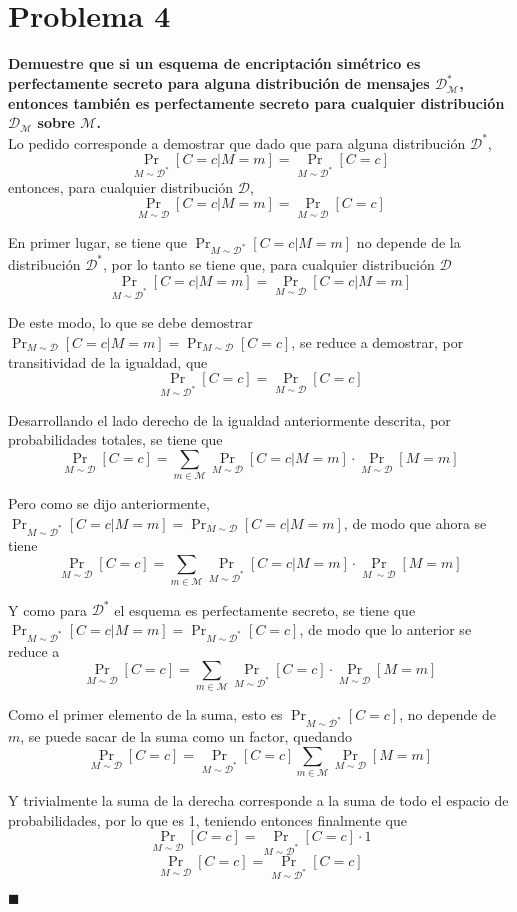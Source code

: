\documentclass[twoside]{tareas}
\begin{document}
\section*{Problema 4}

\textbf{Demuestre que si un esquema de encriptación simétrico es perfectamente secreto para alguna distribución de mensajes $\mathcal{D}_{\mathcal{M}}^{*}$, entonces también es perfectamente secreto para cualquier distribución $\mathcal{D}_{\mathcal{M}}$ sobre $\mathcal{M}$.}\\

Lo pedido corresponde a demostrar que dado que para alguna distribución $\mathcal{D}^*$,
$$\Pr_{M \sim \mathcal{D}^*}[C=c | M=m] = \Pr_{M \sim \mathcal{D}^*}[C=c]$$
entonces, para cualquier distribución $\mathcal{D}$,
$$\Pr_{M \sim \mathcal{D}}[C=c | M=m] = \Pr_{M \sim \mathcal{D}}[C=c]$$

En primer lugar, se tiene que $\Pr_{M\sim \mathcal{D}^*}[C=c | M=m]$ no depende de la distribución $\mathcal{D}^*$, por lo tanto se tiene que, para cualquier distribución $\mathcal{D}$
$$\Pr_{M\sim \mathcal{D}^*}[C=c | M=m] = \Pr_{M\sim \mathcal{D}}[C=c | M = m]$$

De este modo, lo que se debe demostrar $\Pr_{M \sim \mathcal{D}}[C=c | M=m] = \Pr_{M \sim \mathcal{D}}[C=c]$, se reduce a demostrar, por transitividad de la igualdad, que
$$\Pr_{M \sim \mathcal{D}^*}[C=c] = \Pr_{M \sim \mathcal{D}}[C=c]$$

Desarrollando el lado derecho de la igualdad anteriormente descrita, por probabilidades totales, se tiene que
$$\Pr_{M \sim \mathcal{D}}[C=c] = \sum_{m \in \mathcal{M}} \Pr_{M \sim \mathcal{D}}[C=c | M=m] \cdot \Pr_{M \sim \mathcal{D}}[M=m]$$

Pero como se dijo anteriormente, $\Pr_{M\sim \mathcal{D}^*}[C=c | M=m] = \Pr_{M\sim \mathcal{D}}[C=c | M = m]$, de modo que ahora se tiene
$$\Pr_{M \sim \mathcal{D}}[C=c] = \sum_{m \in \mathcal{M}} \Pr_{M \sim \mathcal{D}^*}[C=c | M=m] \cdot \Pr_{M~\sim \mathcal{D}}[M=m]$$

Y como para $\mathcal{D}^*$ el esquema es perfectamente secreto, se tiene que $\Pr_{M \sim \mathcal{D}^*}[C=c | M=m] = \Pr_{M \sim \mathcal{D}^*}[C=c]$, de modo que lo anterior se reduce a
$$\Pr_{M \sim \mathcal{D}}[C=c] = \sum_{m \in \mathcal{M}} \Pr_{M \sim \mathcal{D}^*}[C=c] \cdot \Pr_{M \sim \mathcal{D}}[M=m]$$

Como el primer elemento de la suma, esto es $\Pr_{M \sim \mathcal{D}^*}[C=c]$, no depende de $m$, se puede sacar de la suma como un factor, quedando
$$\Pr_{M \sim \mathcal{D}}[C=c] = \Pr_{M \sim \mathcal{D}^*}[C=c] \sum_{m \in \mathcal{M}} \Pr_{M \sim \mathcal{D}}[M=m]$$

Y trivialmente la suma de la derecha corresponde a la suma de todo el espacio de probabilidades, por lo que es 1, teniendo entonces finalmente que
$$\Pr_{M \sim \mathcal{D}}[C=c] = \Pr_{M \sim \mathcal{D}^*}[C=c] \cdot 1$$
$$\Pr_{M \sim \mathcal{D}}[C=c] = \Pr_{M \sim \mathcal{D}^*}[C=c]$$
\begin{flushright} $\blacksquare$ \end{flushright}
\end{document}
